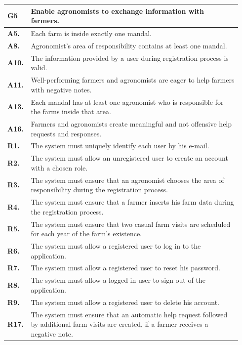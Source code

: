\begin{longtable}{p{0.06\linewidth} p{0.88\linewidth}} 
    \toprule
    \textbf{G5} & Enable agronomists to exchange information with farmers. \\ 
    \midrule
    \textbf{A5.} & Each farm is inside exactly one mandal.\\ 
    \textbf{A8.} & Agronomist's area of responsibility contains at least one mandal.\\ 
    \textbf{A10.} & The information provided by a user during registration process is valid.\\ 
    \textbf{A11.} & Well-performing farmers and agronomists are eager to help farmers with negative notes.\\ 
    \textbf{A13.} & Each mandal has at least one agronomist who is responsible for the farms inside that area.\\ 
    \textbf{A16.} & Farmers and agronomists create meaningful and not offensive help requests and responses. \\
    \midrule
    
	\textbf{R1.} & The system must uniquely identify each user by his e-mail. \\
	\textbf{R2.} & The system must allow an unregistered user to create an account with a chosen role. \\
	\textbf{R3.} & The system must ensure that an agronomist chooses the area of responsibility during the registration process. \\
	\textbf{R4.} & The system must ensure that a farmer inserts his farm data during the registration process.\\
	\textbf{R5.} & The system must ensure that two casual farm visits are scheduled for each year of the farm's existence.\\
	\textbf{R6.} & The system must allow a registered user to log in to the application. \\
	\textbf{R7.} & The system must allow a registered user to reset his password. \\
	\textbf{R8.} & The system must allow a logged-in user to sign out of the application. \\
	\textbf{R9.} & The system must allow a registered user to delete his account. \\
	
    \textbf{R17.} & The system must ensure that an automatic help request followed by additional farm visits are created, if a farmer receives a negative note.\\
	

\end{longtable}
